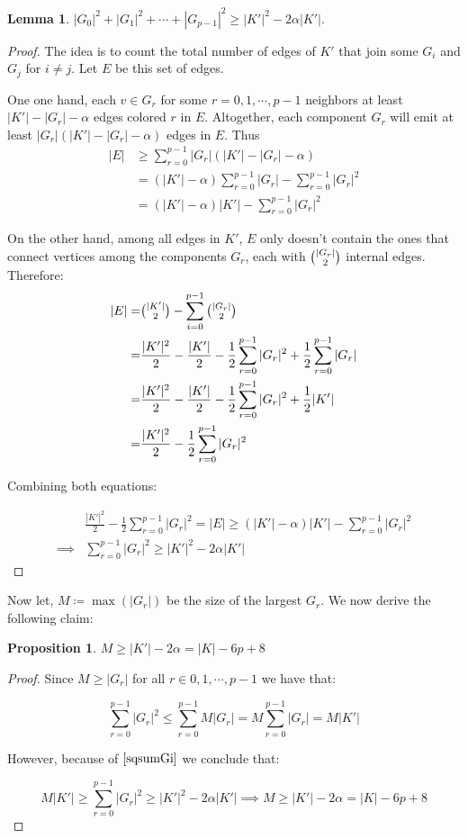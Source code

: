 \documentclass{article}
\numberwithin{table}{section}
\newtheorem{lemma}[theorem]{Lemma}
\newtheorem{prop}[theorem]{Proposition}
\begin{document}
\begin{lemma}\label{sqsumGi}
    $|G_0|^2+|G_1|^2+\cdots+|G_{p-1}|^2 \geq |K'|^2-2\alpha|K'|. $
\end{lemma}
\begin{proof}
    The idea is to count the total number of edges of $K'$ that join some $G_i$ and $G_j$ for $i\neq j$. Let $E$ be this set of edges.


    One one hand, each $v \in G_r$ for some $r =0,1,\cdots,p-1$ neighbors at least $|K'|-|G_r|-\alpha$ edges colored $r$ in $E$. Altogether, each component $G_r$ will emit at least $|G_r|(|K'|-|G_r|-\alpha)$ edges in $E$. Thus
\begin{align*}
    |E| &\geq  \sum_{r=0}^{p-1}|G_r|(|K'|-|G_r|-\alpha)\\
    & = (|K'|-\alpha)\sum_{r=0}^{p-1}|G_r|-\sum_{r=0}^{p-1}|G_r|^2 \\
    &= (|K'|-\alpha)|K'|-\sum_{r=0}^{p-1}|G_r|^2 
\end{align*}

    On the other hand, among all edges in $K'$, $E$ only doesn't contain the ones that connect vertices among the components $G_r$, each with $\tbinom{|G_r|}{2}$ internal edges. Therefore:
\begin{align*}
        |E| =& \tbinom{|K'|}{2}-\sum_{i=0}^{p-1}\tbinom{|G_r|}{2} \\
        =& \frac{|K'|^2}{2}-\frac{|K'|}{2}-\frac{1}{2}\sum_{r=0}^{p-1}|G_r|^2+\frac{1}{2}\sum_{r=0}^{p-1}|G_r| \\
        =& \frac{|K'|^2}{2}-\frac{|K'|}{2}-\frac{1}{2}\sum_{r=0}^{p-1}|G_r|^2+\frac{1}{2}|K'| \\
        =&\frac{|K'|^2}{2}-\frac{1}{2}\sum_{r=0}^{p-1}|G_r|^2
        \end{align*}



    Combining both equations:

   \begin{align*}
        &\frac{|K'|^2}{2}-\frac{1}{2}\sum_{r=0}^{p-1}|G_r|^2 = |E| \geq (|K'|-\alpha)|K'|-\sum_{r=0}^{p-1}|G_r|^2 \\
        \implies&\sum_{r=0}^{p-1}|G_r|^2 \geq |K'|^2-2\alpha |K'|
   \end{align*}

  
\end{proof}

Now let, $M \coloneq \max(|G_r|)$ be the size of the largest $G_r$. We now derive the following claim:
\begin{prop}
    $M\geq |K'|-2\alpha = |K|-6p+8$
\end{prop}
\begin{proof}
    Since $M\geq |G_r|$ for all $r\in0,1,\cdots,p-1$ we have that:

    $$\sum_{r=0}^{p-1}|G_r|^2\leq \sum _{r=0}^{p-1}M|G_r| = M\sum_{r=0}^{p-1}|G_r| = M|K'|$$

    However, because of $\ref{sqsumGi}$ we conclude that:

    $$M|K'| \geq \sum_{r=0}^{p-1}|G_r|^2\geq |K'|^2-2\alpha|K'| \implies M \geq |K'|-2\alpha= |K|-6p+8$$
\end{proof}
\end{document}
